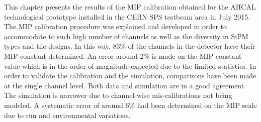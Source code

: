 This chapter presents the results of the MIP calibration obtained for the AHCAL technological prototype installed in the CERN SPS testbeam area in July 2015. The MIP calibration procedure was explained and developed in order to accommodate to such high number of channels as well as the diversity in SiPM types and tile designs. In this way, 83\% of the channels in the detector have their MIP constant determined. An error around 2\% is made on the MIP constant value which is in the order of magnitude expected due to the limited statistics. In order to validate the calibration and the simulation, comparisons have been made at the single channel level. Both data and simulation are in a good agreement. The simulation is narrower due to channel-wise mis-calibrations not being modeled. A systematic error of around 6\% had been determined on the MIP scale due to run and environmental variations.
